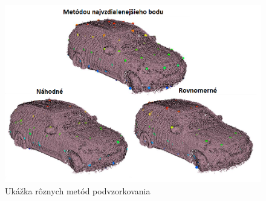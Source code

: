 \begin{figure}[!htbp]
  \centering
  \includegraphics[width=15cm]{img/downsample.png}
  \caption{Ukážka rôznych metód podvzorkovania \cite{downsample_img}}
  \label{downsample}
\end{figure}

